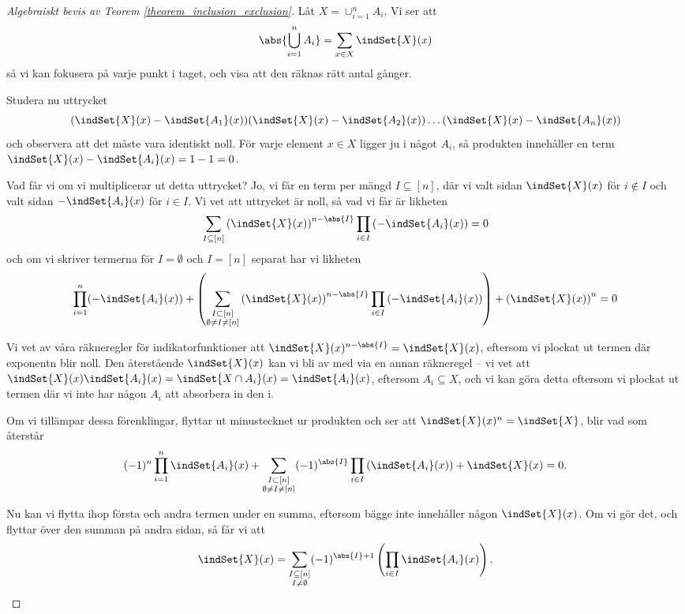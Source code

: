\documentclass[nobib]{tufte-handout}
\begin{document}
\begin{proof}[Algebraiskt bevis av Teorem \ref{theorem_inclusion_exclusion}]
  Låt $X = \cup_{i=1}^n A_i$. Vi ser att
  $$\abs{\bigcup_{i=1}^n A_i} = \sum_{x \in X} \indSet{X}(x)$$
  så vi kan fokusera på varje punkt i taget, och visa att den räknas rätt antal gånger.

  Studera nu uttrycket
  $$(\indSet{X}(x) - \indSet{A_1}(x))(\indSet{X}(x) - \indSet{A_2}(x))\ldots(\indSet{X}(x) - \indSet{A_n}(x))$$
  och observera att det måste vara identiskt noll. För varje element $x\in X$ ligger ju i något $A_i$, så produkten innehåller en term $\indSet{X}(x) - \indSet{A_i}(x) = 1 - 1 = 0$.

  Vad får vi om vi multiplicerar ut detta uttrycket? Jo, vi får en term per mängd $I \subseteq [n]$, där vi valt sidan $\indSet{X}(x)$ för $i\not\in I$ och valt sidan $-\indSet{A_i}(x)$ för $i \in I$. Vi vet att uttrycket är noll, så vad vi får är likheten
  $$\sum_{I \subseteq [n]} \left(\indSet{X}(x)\right)^{n - \abs{I}}\prod_{i\in I}\left(-\indSet{A_i}(x)\right) = 0$$
  och om vi skriver termerna för $I = \emptyset$ och $I = [n]$ separat har vi likheten
  $$\prod_{i=1}^{n} (-\indSet{A_i}(x)) + \left(\sum_{\substack{I \subset [n]\\\emptyset \neq I \neq [n]}} \left(\indSet{X}(x)\right)^{n - \abs{I}}\prod_{i\in I}\left(-\indSet{A_i}(x)\right)\right) + \left(\indSet{X}(x)\right)^n = 0$$

  Vi vet av våra räkneregler för indikatorfunktioner att $\indSet{X}(x)^{n-\abs{I}} = \indSet{X}(x)$, eftersom vi plockat ut termen där exponentn blir noll. Den återstående $\indSet{X}(x)$ kan vi bli av med via en annan räkneregel -- vi vet att $\indSet{X}(x)\indSet{A_i}(x) = \indSet{X \cap A_i}(x) = \indSet{A_i}(x)$, eftersom $A_i \subseteq X$, och vi kan göra detta eftersom vi plockat ut termen där vi inte har någon $A_i$ att absorbera in den i. 
  
  Om vi tillämpar dessa förenklingar, flyttar ut minustecknet ur produkten och ser att $\indSet{X}(x)^n = \indSet{X}$, blir vad som återstår
  $$(-1)^n\prod_{i=1}^{n} \indSet{A_i}(x) + \sum_{\substack{I \subset [n]\\\emptyset \neq I \neq [n]}} (-1)^{\abs{I}}\prod_{i\in I}\left(\indSet{A_i}(x)\right) + \indSet{X}(x) = 0.$$
  
  Nu kan vi flytta ihop första och andra termen under en summa, eftersom bägge inte innehåller någon $\indSet{X}(x)$. Om vi gör det, och flyttar över den summan på andra sidan, så får vi att
  $$\indSet{X}(x) = \sum_{\substack{I \subseteq [n]\\I \neq \emptyset}} (-1)^{\abs{I} + 1}\left(\prod_{i\in I} \indSet{A_i}(x)\right).$$


\end{proof}
\end{document}
